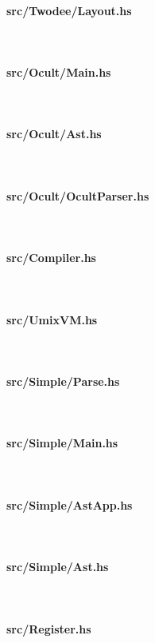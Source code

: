 \documentclass[a4paper, oneside, 10pt, draft]{memoir}
\begin{document}

\clearpage\paragraph{src/Twodee/Layout.hs}\ \\

\clearpage\paragraph{src/Ocult/Main.hs}\ \\

\clearpage\paragraph{src/Ocult/Ast.hs}\ \\

\clearpage\paragraph{src/Ocult/OcultParser.hs}\ \\

\clearpage\paragraph{src/Compiler.hs}\ \\

\clearpage\paragraph{src/UmixVM.hs}\ \\

\clearpage\paragraph{src/Simple/Parse.hs}\ \\

\clearpage\paragraph{src/Simple/Main.hs}\ \\

\clearpage\paragraph{src/Simple/AstApp.hs}\ \\

\clearpage\paragraph{src/Simple/Ast.hs}\ \\

\clearpage\paragraph{src/Register.hs}\ \\

\end{document}
